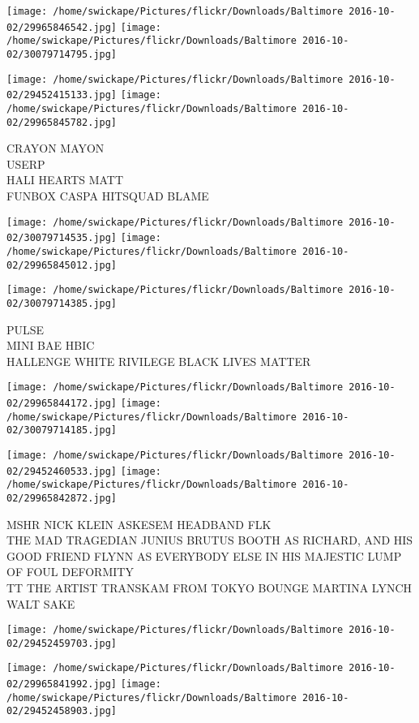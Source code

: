 \documentclass[10pt,letterpaper]{article}
\begin{document}
\texttt{[image: /home/swickape/Pictures/flickr/Downloads/Baltimore 2016-10-02/29965846542.jpg]}
\texttt{[image: /home/swickape/Pictures/flickr/Downloads/Baltimore 2016-10-02/30079714795.jpg]}

\texttt{[image: /home/swickape/Pictures/flickr/Downloads/Baltimore 2016-10-02/29452415133.jpg]}
\texttt{[image: /home/swickape/Pictures/flickr/Downloads/Baltimore 2016-10-02/29965845782.jpg]}

CRAYON MAYON\\
USERP\\
HALI HEARTS MATT\\
FUNBOX CASPA HITSQUAD BLAME
\pagebreak

\texttt{[image: /home/swickape/Pictures/flickr/Downloads/Baltimore 2016-10-02/30079714535.jpg]}
\texttt{[image: /home/swickape/Pictures/flickr/Downloads/Baltimore 2016-10-02/29965845012.jpg]}

\vspace{0.25in}
\texttt{[image: /home/swickape/Pictures/flickr/Downloads/Baltimore 2016-10-02/30079714385.jpg]}

PULSE\\
MINI BAE HBIC\\
HALLENGE WHITE RIVILEGE BLACK LIVES MATTER
\pagebreak

\texttt{[image: /home/swickape/Pictures/flickr/Downloads/Baltimore 2016-10-02/29965844172.jpg]}
\texttt{[image: /home/swickape/Pictures/flickr/Downloads/Baltimore 2016-10-02/30079714185.jpg]}

\texttt{[image: /home/swickape/Pictures/flickr/Downloads/Baltimore 2016-10-02/29452460533.jpg]}
\texttt{[image: /home/swickape/Pictures/flickr/Downloads/Baltimore 2016-10-02/29965842872.jpg]}

MSHR NICK KLEIN ASKESEM HEADBAND FLK\\
THE MAD TRAGEDIAN JUNIUS BRUTUS BOOTH AS RICHARD, AND HIS GOOD FRIEND FLYNN AS EVERYBODY ELSE IN HIS MAJESTIC LUMP OF FOUL DEFORMITY\\
TT THE ARTIST TRANSKAM FROM TOKYO BOUNGE MARTINA LYNCH\\
WALT SAKE
\pagebreak

\texttt{[image: /home/swickape/Pictures/flickr/Downloads/Baltimore 2016-10-02/29452459703.jpg]}

\vspace{0.25in}
\texttt{[image: /home/swickape/Pictures/flickr/Downloads/Baltimore 2016-10-02/29965841992.jpg]}
\texttt{[image: /home/swickape/Pictures/flickr/Downloads/Baltimore 2016-10-02/29452458903.jpg]}
\end{document}
